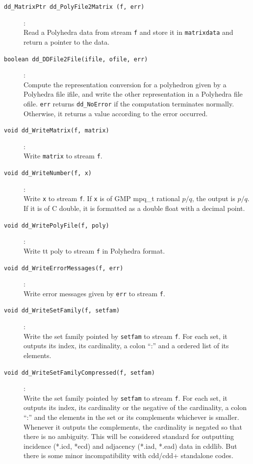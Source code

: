\documentclass[11pt]{article}
\newcommand {\0} {{\bf 0}}
\begin{document}
\begin{description}

\item[{\tt dd\_MatrixPtr dd\_PolyFile2Matrix (f, err)}]:\\
Read a Polyhedra data from stream {\tt f} and store it in {\tt matrixdata}
and return a pointer to the data.

\item[{\tt boolean dd\_DDFile2File(ifile, ofile, err)}]:\\
Compute the representation conversion for a polyhedron given
by a Polyhedra file ifile, and write the other representation
in a Polyhedra file ofile.  {\tt *err}
returns {\tt dd\_NoError} if the computation terminates normally.  Otherwise,
it returns a value according to the error occurred.

\item[{\tt void dd\_WriteMatrix(f, matrix)}]:\\
Write {\tt  matrix} to stream {\tt f}.

\item[{\tt void dd\_WriteNumber(f, x)}]:\\
Write {\tt x} to stream {\tt f}.  If {\tt x} is of GMP mpq\_t rational $p/q$,
the output is $p/q$.  If it is of C double, it is formatted as a double float
with a decimal point.

\item[{\tt void dd\_WritePolyFile(f, poly)}]:\\
Write {tt poly} to stream {\tt f} in Polyhedra format.

\item[{\tt void dd\_WriteErrorMessages(f, err)}]:\\
Write error messages given by {\tt err} to stream {\tt f}.

\item[{\tt void dd\_WriteSetFamily(f, setfam)}]:\\
Write the set family pointed by {\tt setfam} to stream {\tt f}.
For each set, it outputs its index, its cardinality,
a colon ``:'' and a ordered list of its elements.

\item[{\tt void dd\_WriteSetFamilyCompressed(f, setfam)}]:\\
Write the set family pointed by {\tt setfam} to stream {\tt f}.
For each set, it outputs its index, its cardinality or the
negative of the cardinality, a colon ``:''
 and the elements in the set or its complements whichever is smaller.
Whenever it outputs the complements, the cardinality is negated
so that there is no ambiguity.
This will be considered standard for
outputting incidence (*.icd, *ecd) and adjacency
(*.iad, *.ead) data in cddlib.   But there is some minor incompatibility
with cdd/cdd+ standalone codes.


\end{description}
\end{document}
